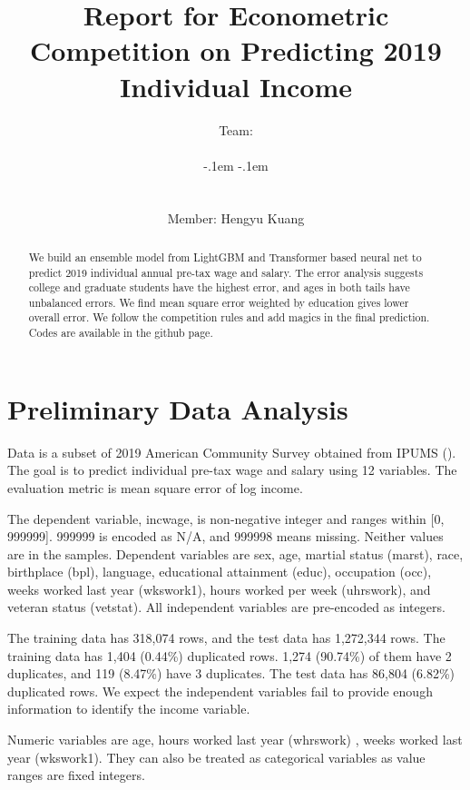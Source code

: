 \documentclass[11pt, letter,twocolumn]{article}
\newcommand{\teamname}{
\rule[1.3ex]{.25em}{1pt}\kern-.1em%
\reflectbox{\small\ttfamily/}%
\kern-.1em\rule[-.2ex]{.4em}{1pt}%
\makebox{{\raisebox{.15em}{{\large\textcircled{
					\ttfamily\kern-.35em%
					\rotatebox[origin=t]{-120}{\bfseries\scriptsize`\kern-.3ex`}%
					\kern-.15em\rotatebox{-45}{\bfseries\scriptsize)}}}}%
		\rule[-.2ex]{.4em}{1pt}\kern-.1em{\small\ttfamily/}%
		\kern-.1em\rule[1.3ex]{.25em}{1pt}}} 

}
\begin{document}
\title{Report for Econometric Competition on Predicting 2019 Individual Income}
\author{Team:  \teamname \\ Member: Hengyu Kuang}
\maketitle

\begin{abstract}
We build an ensemble model from LightGBM and Transformer based neural net to predict 2019 individual annual pre-tax wage and salary. The error analysis suggests college and graduate students have the highest error, and ages in both tails have unbalanced errors. We find    mean square error weighted by education   gives lower overall error. We follow the competition rules and add magics in the final prediction. Codes are available in the github page. 
\end{abstract}



\section{Preliminary Data Analysis }
Data is a subset of 2019 American Community Survey obtained from IPUMS (\cite{ruggles_ipums_2021}). The goal is to predict individual pre-tax wage and salary  using 12 variables. The evaluation metric is mean square error of log income. 

The dependent variable, incwage, is non-negative integer and ranges within [0, 999999].  999999 is encoded as  N/A, and  999998 means missing. Neither values are in the samples. Dependent variables are sex, age, martial status (marst), race, birthplace (bpl), language, educational attainment (educ), occupation (occ), weeks worked last year (wkswork1), hours worked per week (uhrswork), and veteran status (vetstat). All independent variables are pre-encoded as integers. 
% 

The training data has 318,074 rows, and the test data has 1,272,344 rows. The training data has 1,404 (0.44\%) duplicated rows. 1,274 (90.74\%) of them  have 2 duplicates, and 119 (8.47\%) have 3 duplicates. The test data has 86,804 (6.82\%) duplicated rows. We expect the independent variables fail to provide enough information to identify the income variable. 

Numeric variables are age, hours worked last year (whrswork) , weeks worked last year (wkswork1). They can also be treated as categorical variables as value ranges are fixed integers.
\end{document}
